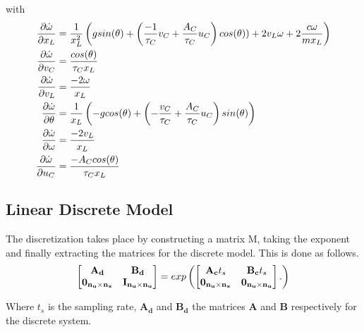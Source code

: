 \documentclass[12pt]{article}
\begin{document}
with 
\begin{equation*}
\begin{aligned}
\frac{\partial{\dot{\omega}}}{\partial{x_L}} &= \frac{1}{x_L^2} \* \left( g\*sin(\theta) + \left( \frac{-1}{\tau_C} \* v_C + \frac{A_C}{\tau_C} \* u_C \right) \* cos(\theta)) + 2\*v_L\*\omega + 2\*\frac{c\*\omega}{m\*x_L} \right)\\
\frac{\partial{\dot{\omega}}}{\partial{v_C}} &= \frac{cos(\theta)}{\tau_C\*x_L} \\
\frac{\partial{\dot{\omega}}}{\partial{v_L}} &= \frac{-2\*\omega}{x_L} \\
\frac{\partial{\dot{\omega}}}{\partial{\theta}} &= \frac{1}{x_L} \* \left( - g\*cos(\theta) + \left( -\frac{v_C}{\tau_C} + \frac{A_C}{\tau_C}\*u_C \right)\*sin(\theta) \right) \\
\frac{\partial{\dot{\omega}}}{\partial{\omega}} &= \frac{-2\*v_L}{x_L} \\
\frac{\partial{\dot{\omega}}}{\partial{u_C}} &= \frac{-A_C\*cos(\theta)}{\tau_C\*x_L} \\
\end{aligned}
\end{equation*}

\subsection{Linear Discrete Model}
The discretization takes place by constructing a matrix M, taking the exponent and finally extracting the matrices for the discrete model. This is done as follows.
\begin{equation*}
\begin{bmatrix}
\mathbf{A_d} & \mathbf{B_d} \\
\mathbf{0_{n_u \times n_x}} & \mathbf{I_{n_u \times n_u}}
\end{bmatrix}
=
exp\left(
\begin{bmatrix}
\mathbf{A_c} \* t_s & \mathbf{B_c}\*t_s \\
\mathbf{0_{n_u \times n_x}} & \mathbf{0_{n_u \times n_u}} \\
\end{bmatrix}.
\right)
\end{equation*}

Where $t_s$ is the sampling rate, $\mathbf{A_d}$ and $\mathbf{B_d}$ the matrices $\mathbf{A}$ and $\mathbf{B}$ respectively for the discrete system.
\end{document}
